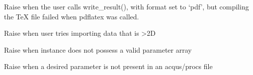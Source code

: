 \documentclass[letterpaper,10pt,english]{sphinxmanual}
\begin{document}
\begin{fulllineitems}
\label{\detokenize{references/errors:nmrespy._errors.LaTeXFailedError}}
\sphinxAtStartPar
Raise when the user calls write\_result(), with format set to ‘pdf’,
but compiling the TeX file failed when pdflatex was called.

\end{fulllineitems}


\begin{fulllineitems}
\label{\detokenize{references/errors:nmrespy._errors.MoreThanTwoDimError}}
\sphinxAtStartPar
Raise when user tries importing data that is >2D

\end{fulllineitems}


\begin{fulllineitems}
\label{\detokenize{references/errors:nmrespy._errors.NoParameterEstimateError}}
\sphinxAtStartPar
Raise when instance does not possess a valid parameter array

\end{fulllineitems}


\begin{fulllineitems}
\label{\detokenize{references/errors:nmrespy._errors.ParameterNotFoundError}}
\sphinxAtStartPar
Raise when a desired parameter is not present in an acqus/procs file

\end{fulllineitems}

\end{document}

